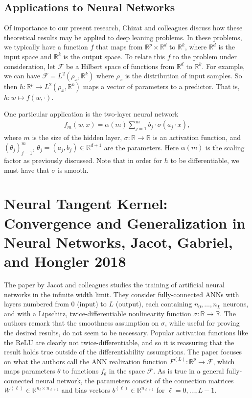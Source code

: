 \documentclass{article}
\begin{document}
\subsection{Applications to Neural Networks}
Of importance to our present research, Chizat and colleagues discuss how these theoretical results may be applied to deep leaning problems. In these problems, we typically have a function $f$ that maps from $\mathbb{R}^p \times \mathbb{R}^d$ to $\mathbb{R}^k$, where $\mathbb{R}^d$ is the input space and $\mathbb{R}^k$ is the output space. To relate this $f$ to the problem under consideration, let $\mathcal{F}$ be a Hilbert space of functions from $\mathbb{R}^d$ to $\mathbb{R}^k$. For example, we can have $\mathcal{F} = L^2(\rho_x, \mathbb{R}^k)$ where $\rho_x$ is the distribution of input samples. So then $h: \mathbb{R}^p \rightarrow L^2(\rho_x, \mathbb{R}^k)$ maps a vector of parameters to a predictor. That is, $h: w \mapsto f(w, \cdot)$.

One particular application is the two-layer neural network
\begin{align*}
    f_m(w, x) = \alpha(m) \sum_{j=1}^m b_j \cdot \sigma(a_j \cdot x),
\end{align*}
where $m$ is the size of the hidden layer, $\sigma: \mathbb{R} \rightarrow \mathbb{R}$ is an activation function, and $(\theta_j)_{j=1}^m$, $\theta_j = (a_j, b_j) \in \mathbb{R}^{d+1}$ are the parameters. Here $\alpha(m)$ is the scaling factor as previously discussed. Note that in order for $h$ to be differentiable, we must have that $\sigma$ is smooth.

\section{Neural Tangent Kernel: Convergence and Generalization in Neural Networks, Jacot, Gabriel, and Hongler 2018}

The paper by Jacot and colleagues studies the training of artificial neural networks in the infinite width limit. They consider fully-connected ANNs with layers numbered from $0$ (input) to $L$ (output), each containing $n_0, \ldots, n_L$ neurons, and with a Lipschitz, twice-differentiable nonlinearity function $\sigma: \mathbb{R} \rightarrow \mathbb{R}$. The authors remark that the smoothness assumption on $\sigma$, while useful for proving the desired results, do not seem to be necessary. Popular activation functions like the ReLU are clearly not twice-differentiable, and so it is reassuring that the result holds true outside of the differentiability assumptions. The paper focuses on what the authors call the ANN realization function $F^{(L)}: \mathbb{R}^p \rightarrow \mathcal{F}$, which maps parameters $\theta$ to functions $f_{\theta}$ in the space $\mathcal{F}$. As is true in a general fully-connected neural network, the parameters consist of the connection matrices $W^{(\ell)} \in \mathbb{R}^{n_{\ell} \times n_{\ell +1}}$ and bias vectors $b^{(\ell)} \in \mathbb{R}^{n_{\ell + 1}}$ for $\ell = 0, \ldots, L-1$. 
\end{document}
